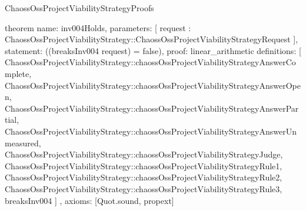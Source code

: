 \begin{lexlean}{ChaossOssProjectViabilityStrategyProofs}
\begin{semanticmodule}
theorem{
  name: inv004Holds,
  parameters: [
    request : ChaossOssProjectViabilityStrategy::ChaossOssProjectViabilityStrategyRequest
  ],
  statement: ((breaksInv004 request) = false),
  proof: linear_arithmetic{
    definitions: [
      ChaossOssProjectViabilityStrategy::chaossOssProjectViabilityStrategyAnswerComplete,
      ChaossOssProjectViabilityStrategy::chaossOssProjectViabilityStrategyAnswerOpen,
      ChaossOssProjectViabilityStrategy::chaossOssProjectViabilityStrategyAnswerPartial,
      ChaossOssProjectViabilityStrategy::chaossOssProjectViabilityStrategyAnswerUnmeasured,
      ChaossOssProjectViabilityStrategy::chaossOssProjectViabilityStrategyJudge,
      ChaossOssProjectViabilityStrategy::chaossOssProjectViabilityStrategyRule1,
      ChaossOssProjectViabilityStrategy::chaossOssProjectViabilityStrategyRule2,
      ChaossOssProjectViabilityStrategy::chaossOssProjectViabilityStrategyRule3,
      breaksInv004
    ]
  },
  axioms: [Quot.sound, propext]
}
\end{semanticmodule}
\end{lexlean}
